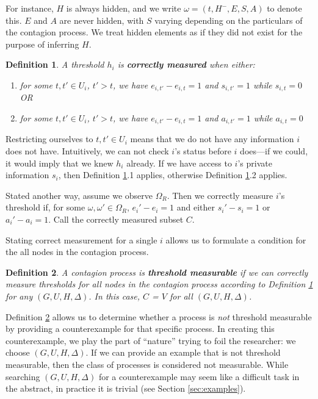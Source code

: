 \documentclass[a4paper]{article}
\newtheorem{definition}{Definition}
\begin{document}
\noindent
For instance, $H$ is always hidden, and we write $\omega = (t, H^-, E, S, A)$ to denote this. $E$ and $A$ are never hidden, with $S$ varying depending on the particulars of the contagion process. We treat hidden elements as if they did not exist for the purpose of inferring $H$.

\begin{definition} \label{def:measured}
A threshold $h_i$ is \textbf{correctly measured} when either:
\begin{enumerate}
\item for some $t, t' \in U_i$, $t' > t$, we have $e_{i,t'} - e_{i,t} = 1$ and $s_{i,t'} = 1$ while $s_{i,t} = 0$
OR
\item for some $t, t' \in U_i$, $t' > t$, we have $e_{i,t'} - e_{i,t} = 1$ and $a_{i,t'} = 1$ while $a_{i,t} = 0$
\end{enumerate}
\end{definition}

\noindent
Restricting ourselves to $t, t' \in U_i$ means that we do not have any information $i$ does not have. Intuitively, we can not check $i$'s status before $i$ does---if we could, it would imply that we knew $h_i$ already. If we have access to $i$'s private information $s_i$, then Definition \ref{def:measured}.1 applies, otherwise Definition \ref{def:measured}.2 applies.

Stated another way, assume we observe $\Omega_R$. Then we correctly measure $i$'s threshold if, for some $\omega, \omega' \in \Omega_R$, $e_i' - e_i = 1$ and either $s_i' - s_i = 1$ or $a_i' - a_i = 1$. Call the correctly measured subset $C$. 

Stating correct measurement for a single $i$ allows us to formulate a condition for the all nodes in the contagion process.

\begin{definition} \label{def:measurable}
A contagion process is \textbf{threshold measurable} if we can correctly measure thresholds for all nodes in the contagion process according to Definition \ref{def:measured} for any $(G, U, H, \Delta)$. In this case, $C$ = $V$ for all $(G, U, H, \Delta)$.
\end{definition}

\noindent
Definition \ref{def:measurable} allows us to determine whether a process is \emph{not} threshold measurable by providing a counterexample for that specific process. In creating this counterexample, we play the part of ``nature'' trying to foil the researcher: we choose $(G, U, H, \Delta)$. If we can provide an example that is not threshold measurable, then the class of processes is considered not measurable. While searching $(G, U, H, \Delta)$ for a counterexample may seem like a difficult task in the abstract, in practice it is trivial (see Section \ref{sec:examples}).
\end{document}
